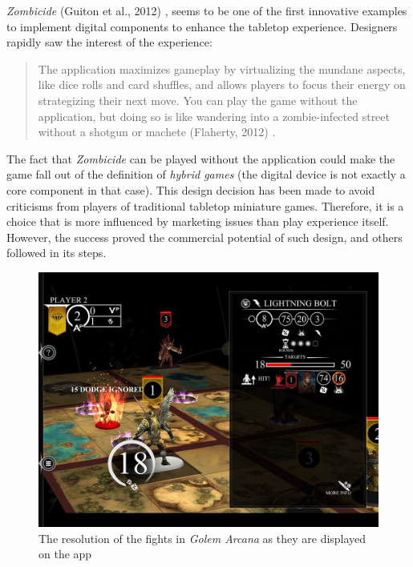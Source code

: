 \textit{Zombicide} (Guiton et al., 2012) \cite{game:zombi}, seems to be one of the first innovative examples to implement digital components to enhance the tabletop experience. Designers rapidly saw the interest of the experience:

\begin{quotation}
The application maximizes gameplay by virtualizing the mundane aspects, like dice rolls and card shuffles, and allows players to focus their energy on strategizing their next move. You can play the game without the application, but doing so is like wandering into a zombie-infected street without a shotgun or machete (Flaherty, 2012) \cite{web:wired}.
\end{quotation}

The fact that \textit{Zombicide} can be played without the application could make the game fall out of the definition of \textit{hybrid games} (the digital device is not exactly a core component in that case). This design decision has been made to avoid criticisms from players of traditional tabletop miniature games. Therefore, it is a choice that is more influenced by marketing issues than play experience itself. However, the success proved the commercial potential of such design, and others followed in its steps.

\begin{figure}[!ht]
    \centering
    \includegraphics[scale=0.2]{Images/golem_app.jpg}
    \caption{The resolution of the fights in \textit{Golem Arcana} as they are displayed on the app}
    \label{fig:Golem}
\end{figure}

